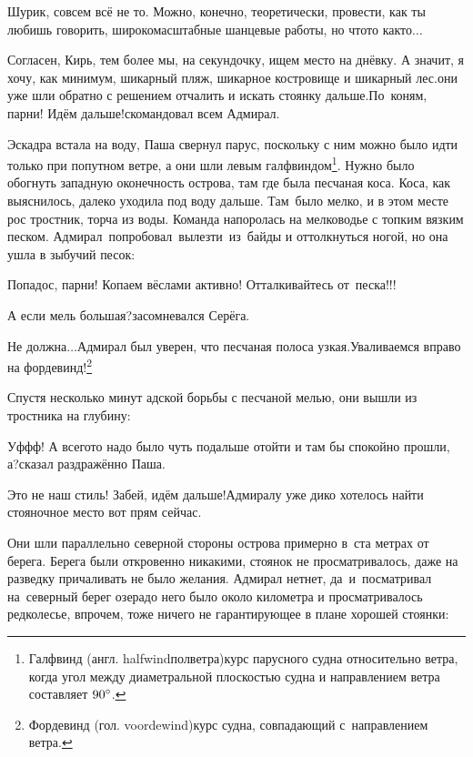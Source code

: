 \diagdash Шурик, совсем всё не то. Можно, конечно, теоретически, провести, как ты любишь говорить, широкомасштабные шанцевые работы, но что\sdash то как\sdash то$\ldots$

\diagdash Согласен, Кирь, тем более мы, на секундочку, ищем место на днёвку. А значит, я хочу, как минимум, шикарный пляж, шикарное костровище и шикарный лес.\mdash они уже шли обратно с решением отчалить и искать стоянку дальше.\mdash По~коням, парни! Идём дальше!\mdash скомандовал всем Адмирал.

\renewcommand*{\thefootnote}{\arabic{footnote}}
\setcounter{footnote}{0}
Эскадра встала на воду, Паша свернул парус, поскольку с ним можно было идти только при попутном ветре, а они шли левым галфвиндом\footnote{Галфвинд (англ. halfwind\mdash полветра)\mdash курс парусного судна относительно ветра, когда угол между диаметральной плоскостью судна и направлением ветра составляет $90\degree$\cite{МорскойСправочник}.}. Нужно было обогнуть западную оконечность острова, там где была песчаная коса. Коса, как выяснилось, далеко уходила под воду дальше. Там~было мелко, и в этом месте рос тростник, торча из воды. Команда напоролась на мелководье с топким вязким песком. Адмирал~попробовал~вылезти~из~байды и оттолкнуться ногой, но она ушла в зыбучий песок:

\diagdash Попадос, парни! Копаем вёслами активно! Отталкивайтесь от~песка!!!

\diagdash А если мель большая?\mdash засомневался Серёга.

\diagdash Не должна$\ldots$\mdash Адмирал был уверен, что песчаная полоса узкая.\mdash Уваливаемся вправо на фордевинд!\footnote{Фордевинд (гол. voordewind)\mdash курс судна, совпадающий с~направлением ветра\cite{МорскойСправочник}.}

Спустя несколько минут адской борьбы с песчаной мелью, они вышли из тростника на глубину:

\diagdash Уф\sdash ф\sdash ф! А всего\sdash то надо было чуть подальше отойти и там бы спокойно прошли, а?\mdash сказал раздражённо Паша.

\diagdash Это не наш стиль! Забей, идём дальше!\mdash Адмиралу уже дико хотелось найти стояночное место вот прям сейчас. 

Они шли параллельно северной стороны острова примерно в~ста метрах от берега. Берега были откровенно никакими, стоянок не просматривалось, даже на разведку причаливать не было желания. Адмирал нет\sdash нет, да~и~посматривал на~северный берег озера\mdash до него было около километра и просматривалось редколесье, впрочем, тоже ничего не гарантирующее в плане хорошей стоянки:

